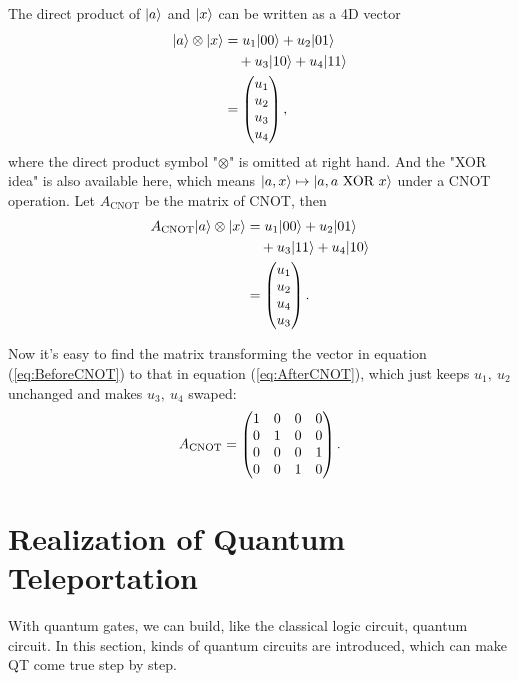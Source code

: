 		The direct product of $|{a} \rangle$ and $|{x} \rangle$ can be written as a 4D vector
		\begin{equation} 
			\begin{split}
			\bra{a}\otimes\bra{x} &= u_1\bra{00} +u_2\bra{01}\\
				&\quad+u_3\bra{10}+u_4\bra{11}\\
				&=\begin{pmatrix*}[r] u_1\\u_2\\u_3\\u_4 \end{pmatrix*},
			\end{split}
		\label{eq:BeforeCNOT}
		\end{equation}
		where the direct product symbol "$\otimes$" is omitted at right hand.
		And the "XOR idea" is also available here, which means 
		$\bra{a,x} \mapsto \bra{a,a\ \text{XOR}\ x}$ under a CNOT operation. 
		Let $A_{\text{CNOT}}$ be the matrix of CNOT, then
		\begin{equation}
			\begin{split}
			A_{\text{CNOT}} \bra{a}\otimes\bra{x} &= u_1\bra{00} +u_2\bra{01}\\
				&\quad+u_3\bra{11}+u_4\bra{10}\\
				&=\begin{pmatrix*}[r] u_1\\u_2\\u_4\\u_3 \end{pmatrix*}.
			\end{split}
		\label{eq:AfterCNOT}
		\end{equation}

		Now it's easy to find the matrix transforming 
		the vector in equation (\ref{eq:BeforeCNOT}) to that in equation (\ref{eq:AfterCNOT}), 
		which just keeps $u_1,\ u_2$ unchanged and makes $u_3,\  u_4$ swaped:
		\begin{equation}
		A_{\text{CNOT}}= \CNOT.
		\end{equation}

\section{Realization of Quantum Teleportation}
	With quantum gates, we can build, like the classical logic circuit, quantum circuit.
	In this section, kinds of quantum circuits are introduced, 
	which can make QT come true step by step.
